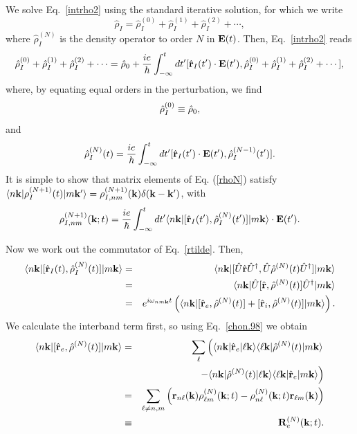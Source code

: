 \documentclass{article}
\begin{document}
We solve Eq.~\eqref{intrho2} using the standard iterative
solution, for which we write
\begin{equation}\label{rhop}
\hat\rho_I=\hat\rho_I^{(0)}+\hat\rho_I^{(1)}+\hat\rho_I^{(2)}+\cdots
,
\end{equation}
where $\hat\rho_I^{(N)}$ is the density operator to order $N$ in $\mathbf{E}(t)$.
Then, Eq.~\eqref{intrho2} reads
\begin{equation}\label{intrho3}
\hat\rho_I^{(0)}+\hat\rho_I^{(1)}+\hat\rho_I^{(2)}+\cdots
=\hat{{\rho}}_0
+
\frac{ie}{\hbar}\int_{-\infty}^t dt'[\hat{\mathbf{r}}_I(t')\cdot\mathbf{E}(t'),
\hat\rho_I^{(0)}+\hat\rho_I^{(1)}+\hat\rho_I^{(2)}+\cdots
]
,
\end{equation}
where, by equating equal orders in the perturbation, we find
\begin{equation}\label{rho0}
\hat{{\rho}}_I^{(0)}\equiv\hat{{\rho}}_0
,
\end{equation}
and
\begin{equation}\label{rhoN}
\hat{{\rho}}_I^{(N)}(t)=
\frac{ie}{\hbar}
\int_{-\infty}^t dt'[\hat{\mathbf{r}}_I(t')\cdot\mathbf{E}(t'),\hat{{\rho}}^{(N-1)}_I(t')].
\end{equation}
It is simple to show that matrix elements of Eq. (\ref{rhoN}) satisfy
$\langle n\mathbf{k} |{\rho}_I^{(N+1)}(t)| m\mathbf{k}' \rangle={\rho}^{(N+1)}_{I,nm}(\mathbf{k})\delta(\mathbf{k}-\mathbf{k}')$,
with
\begin{equation}\label{rtilde}
{\rho}^{(N+1)}_{I,nm}(\mathbf{k};t)
=\frac{ie}{\hbar}\int_{-\infty}^t dt'
\langle n\mathbf{k} |
[\hat{\mathbf{r}}_I(t'),\hat{{\rho}}^{(N)}_I(t')]
| m\mathbf{k} \rangle
\cdot\mathbf{E}(t')
.
\end{equation}

Now we work out the commutator of Eq.~\eqref{rtilde}. Then,
\begin{eqnarray}\label{conmu1}
\langle n\mathbf{k} |
[\hat{\mathbf{r}}_I(t),\hat{{\rho}}^{(N)}_I(t)]
| m\mathbf{k} \rangle
&=&
\langle n\mathbf{k} |
[\hat{U}\hat{\mathbf{r}}\hat{U}^\dagger,\hat{U}\hat{{\rho}}^{(N)}(t)\hat{U}^\dagger]
| m\mathbf{k} \rangle
\nonumber \\
&=&
\langle n\mathbf{k} |
\hat{U}[\hat{\mathbf{r}},\hat{{\rho}}^{(N)}(t)]\hat{U}^\dagger
| m\mathbf{k} \rangle
\\
&=&
e^{i\omega_{nm\mathbf{k}}t}
\left(
\langle n\mathbf{k} |
[\hat{\mathbf{r}}_e,\hat{{\rho}}^{(N)}(t)]
+
[\hat{\mathbf{r}}_i,\hat{{\rho}}^{(N)}(t)]
| m\mathbf{k} \rangle
\right)
\nonumber
.
\end{eqnarray}
We calculate the interband term first, so using Eq.~\eqref{chon.98} we obtain
\begin{eqnarray}\label{conmu2}
\langle n\mathbf{k} |
[\hat{\mathbf{r}}_e,\hat{{\rho}}^{(N)}(t)]
| m\mathbf{k} \rangle
&=&
\sum_{\ell}
\left(
\langle n\mathbf{k} |
\hat{\mathbf{r}}_e
| \ell\mathbf{k} \rangle
\langle \ell\mathbf{k} |
\hat{{\rho}}^{(N)}(t)
| m\mathbf{k} \rangle
\right.
\nonumber \\
&&
\left.
-
\langle n\mathbf{k} |
\hat{{\rho}}^{(N)}(t)
| \ell\mathbf{k} \rangle
\langle \ell\mathbf{k} |
\hat{\mathbf{r}}_e
| m\mathbf{k} \rangle
\right)
\nonumber \\
&=&
\sum_{\ell\ne n,m}
\left(
\mathbf{r}_{n\ell}(\mathbf{k})
{\rho}^{(N)}_{\ell m}(\mathbf{k};t)
-
{\rho}^{(N)}_{n\ell}(\mathbf{k};t)
\mathbf{r}_{\ell m}(\mathbf{k})
\right)
\nonumber\\
&\equiv&
\mathbf{R}^{(N)}_e(\mathbf{k};t)
.
\end{eqnarray}
\end{document}
